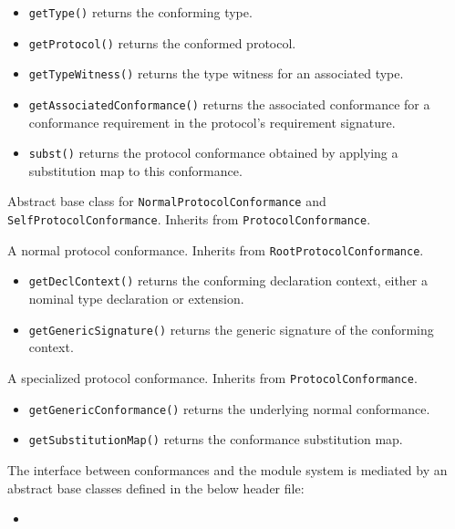 \documentclass[../generics]{subfiles}
\begin{document}
\begin{itemize}
\item \texttt{getType()} returns the conforming type.
\item \texttt{getProtocol()} returns the conformed protocol.
\item \texttt{getTypeWitness()} returns the type witness for an associated type.
\item \texttt{getAssociatedConformance()} returns the associated conformance for a conformance requirement in the protocol's requirement signature.
\item \texttt{subst()} returns the protocol conformance obtained by applying a substitution map to this conformance.
\end{itemize}

Abstract base class for \texttt{NormalProtocolConformance} and \texttt{SelfProtocolConformance}. Inherits from \texttt{ProtocolConformance}.

A normal protocol conformance. Inherits from \texttt{RootProtocolConformance}.
\begin{itemize}
\item \texttt{getDeclContext()} returns the conforming declaration context, either a nominal type declaration or extension.
\item \texttt{getGenericSignature()} returns the generic signature of the conforming context.
\end{itemize}

A specialized protocol conformance. Inherits from \texttt{ProtocolConformance}.
\begin{itemize}
\item \texttt{getGenericConformance()} returns the underlying normal conformance.
\item \texttt{getSubstitutionMap()} returns the conformance substitution map.
\end{itemize}

The interface between conformances and the module system is mediated by an abstract base classes defined in the below header file:
\begin{itemize}
\item {}
\end{itemize}
\end{document}
